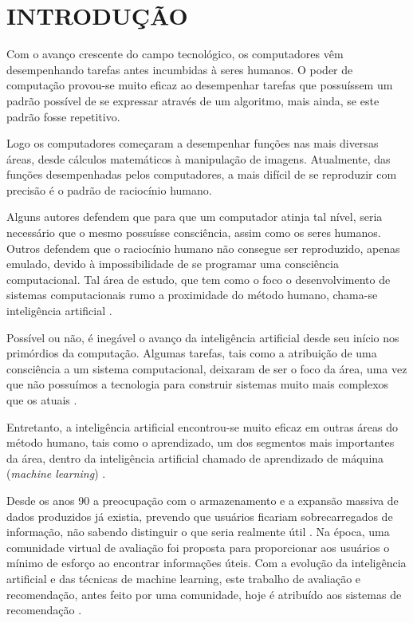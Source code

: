 \documentclass[12pt, openright, oneside, a4paper, brazil]{abntex2}
\begin{document}
\tableofcontents*
\textual

\chapter{INTRODUÇÃO}

Com o avanço crescente do campo tecnológico, os computadores vêm desempenhando tarefas antes incumbidas à seres humanos. O poder de computação provou-se muito eficaz ao desempenhar tarefas que possuíssem um padrão possível de se expressar através de um algoritmo, mais ainda, se este padrão fosse repetitivo.

Logo os computadores começaram a desempenhar funções nas mais diversas áreas, desde cálculos matemáticos à manipulação de imagens. Atualmente, das funções desempenhadas pelos computadores, a mais difícil de se reproduzir com precisão é o padrão de raciocínio humano.

Alguns autores defendem que para que um computador atinja tal nível, seria necessário que o mesmo possuísse consciência, assim como os seres humanos. Outros defendem que o raciocínio humano não consegue ser reproduzido, apenas emulado, devido à impossibilidade de se programar uma consciência computacional. Tal área de estudo, que tem como o foco o desenvolvimento de sistemas computacionais rumo a proximidade do método humano, chama-se inteligência artificial \cite{russell2004inteligencia, coppin2015inteligencia}.

Possível ou não, é inegável o avanço da inteligência artificial desde seu início nos primórdios da computação. Algumas tarefas, tais como a atribuição de uma consciência a um sistema computacional, deixaram de ser o foco da área, uma vez que não possuímos a tecnologia para construir sistemas muito mais complexos que os atuais  \cite{russell2004inteligencia}.

Entretanto, a inteligência artificial encontrou-se muito eficaz em outras áreas do método humano, tais como o aprendizado, um dos segmentos mais importantes da área, dentro da inteligência artificial chamado de aprendizado de máquina (\textit{machine learning}) \cite{coppin2015inteligencia}.

Desde os anos 90 a preocupação com o armazenamento e a expansão massiva de dados produzidos já existia, prevendo que usuários ficariam sobrecarregados de informação, não sabendo distinguir o que seria realmente útil \cite{hill1995recommending, adomavicius2005toward}. Na época, uma comunidade virtual de avaliação foi proposta para proporcionar aos usuários o mínimo de esforço ao encontrar informações úteis. Com a evolução da inteligência artificial e das técnicas de machine learning, este trabalho de avaliação e recomendação, antes feito por uma comunidade, hoje é atribuído aos sistemas de recomendação \cite{hill1995recommending}.
\end{document}
